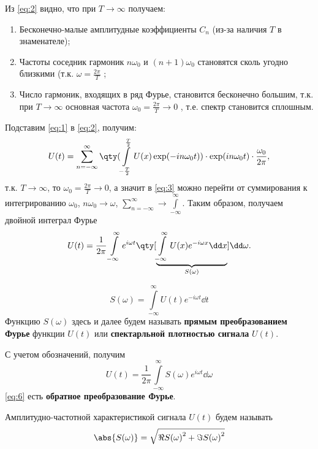 \documentclass[a4paper,14pt]{extarticle}
\begin{document}
Из \eqref{eq:2} видно, что при $T \to \infty$ получаем:
\begin{enumerate}
    \item Бесконечно-малые амплитудные коэффициенты $C_n$ (из-за наличия $T$ 
        в знаменателе);
    \item Частоты соседник гармоник $n \omega_{0}$ и $(n+1) \omega_{0}$ 
        становятся  сколь угодно близкими (т.к. $\omega=\frac{2\pi}{T}$ ;
    \item Число гармоник, входящих в ряд Фурье, становится бесконечно большим, т.к. при $T \to \infty$ основная частота $\omega_{0} = \frac{2 \pi}{T} \to 0$ ,
        т.е. спектр становится сплошным.
\end{enumerate}
Подставим \eqref{eq:1}  в \eqref{eq:2}, получим: 
\begin{equation}
    \label{eq:3}
    U(t) = \sum\limits_{n=-\infty}^{\infty} 
    \qty( 
    \int\limits_{- \frac{T}{2}}^{\frac{T}{2}} U(x) \exp(-in \omega_{0} t)
        )  
        \cdot \exp(in\omega_{0} t) \cdot \frac{\omega_{0}}{2 \pi},
\end{equation}
т.к. $T \to \infty $, то  $\omega_{0} = \frac{2\pi}{T} \to 0$, 
а значит в \eqref{eq:3}  можно перейти от суммирования к интегрированию 
$\omega_{0}$, $n \omega_{0} \to \omega$, 
$\sum\limits_{n=-\infty}^{\infty} \to \int\limits_{-\infty}^{\infty}  $. 
Таким образом, получаем двойной интеграл Фурье
\begin{equation}
    \label{eq:5}
    U(t) = \frac{1}{2 \pi} \int\limits_{-\infty}^{\infty} e^{i \omega t} 
    \qty[ 
    \underbrace{ 
    \int\limits_{-\infty}^{\infty} U(x) e^{- i \omega x} \dd x
}_{S(\omega)}
        ] \dd \omega.
\end{equation}

\begin{equation}
    \boxed{
    S(\omega) = \int\limits_{-\infty}^{\infty} U(t) e^{-i\omega t} \dd{t} 
}
\end{equation}
Функцию $S(\omega)$ здесь и далее будем называть 
\textbf{прямым преобразованием Фурье} функции $U(t)$ или 
\textbf{спектарльной плотностью сигнала} $U(t)$.

С учетом обозначений, получим
\begin{equation}
    \label{eq:6}
    \boxed{
    U(t) = \frac{1}{2 \pi} \int\limits_{-\infty}^{\infty} 
            S(\omega) e^{i \omega t} \dd \omega }
\end{equation}
\eqref{eq:6} есть \textbf{обратное преобразование Фурье}.

Амплитудно-частотной характеристикой сигнала $U(t)$ будем называть 
\begin{equation}
    \abs{S(\omega)} = \sqrt{ \Re{S(\omega)}^2 + \Im{S(\omega)}^2} 
\end{equation} 
\end{document}
